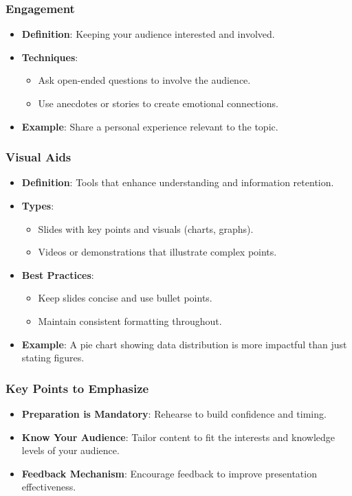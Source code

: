 \documentclass{beamer}
\begin{document}
\begin{frame}[fragile]
    \frametitle{Engagement}
    \begin{itemize}
        \item \textbf{Definition}: Keeping your audience interested and involved.
        \item \textbf{Techniques}:
        \begin{itemize}
            \item Ask open-ended questions to involve the audience.
            \item Use anecdotes or stories to create emotional connections.
        \end{itemize}
        \item \textbf{Example}: Share a personal experience relevant to the topic.
    \end{itemize}
\end{frame}

\begin{frame}[fragile]
    \frametitle{Visual Aids}
    \begin{itemize}
        \item \textbf{Definition}: Tools that enhance understanding and information retention.
        \item \textbf{Types}:
        \begin{itemize}
            \item Slides with key points and visuals (charts, graphs).
            \item Videos or demonstrations that illustrate complex points.
        \end{itemize}
        \item \textbf{Best Practices}:
        \begin{itemize}
            \item Keep slides concise and use bullet points.
            \item Maintain consistent formatting throughout.
        \end{itemize}
        \item \textbf{Example}: A pie chart showing data distribution is more impactful than just stating figures.
    \end{itemize}
\end{frame}

\begin{frame}[fragile]
    \frametitle{Key Points to Emphasize}
    \begin{itemize}
        \item \textbf{Preparation is Mandatory}: Rehearse to build confidence and timing.
        \item \textbf{Know Your Audience}: Tailor content to fit the interests and knowledge levels of your audience.
        \item \textbf{Feedback Mechanism}: Encourage feedback to improve presentation effectiveness.
    \end{itemize}
\end{frame}
\end{document}
